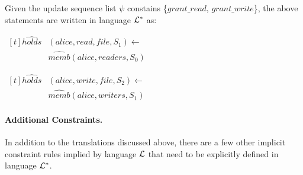 \documentclass[global,twocolumn,final]{svjour}
\newenvironment{vquote}
  {\begin{list}{}{\leftmargin 1em}\item[]}
  {\end{list}}
\begin{document}
          Given the update sequence list $\psi$ constains
          \{$grant\_read$, $grant\_write$\}, the above statements are written
          in language ${\cal L}^{*}$ as:

          \begin{vquote}
            \begin{math}
              \begin{aligned}[t]
                \hat{holds}&(alice, read, file, S_{1}) \leftarrow \\
                & \hat{memb}(alice, readers, S_{0})
              \end{aligned}
            \end{math}

            \begin{math}
              \begin{aligned}[t]
                \hat{holds}&(alice, write, file, S_{2}) \leftarrow \\
                & \hat{memb}(alice, writers, S_{1})
              \end{aligned}
            \end{math}
          \end{vquote}

        \paragraph{Additional Constraints.}

          In addition to the translations discussed above, there are a few
          other implicit constraint rules implied by language ${\cal L}$
          that need to be explicitly defined in language ${\cal L}^{*}$.
\end{document}

